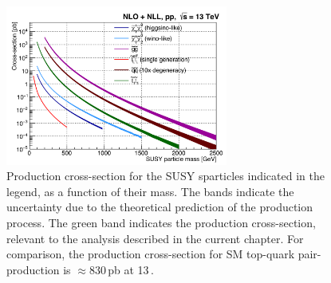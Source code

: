 \begin{figure}[!htb]
    \begin{center}
        \includegraphics[width=0.65\textwidth]{figures/search_stop2l/SUSY_xsec_13TeV_v1}
        \caption{
            Production cross-section for the SUSY sparticles indicated in the legend,
            as a function of their mass.
            The bands indicate the uncertainty due to the theoretical prediction of the production
            process.
            The green band indicates the \stopone production cross-section, relevant to the analysis
            described in the current chapter.
            For comparison, the production cross-section for SM top-quark pair-production is $\approx 830$\,pb at 13\,\TeV.
        }
        \label{fig:susy_xsec}
    \end{center}
\end{figure}

\FloatBarrier
%
%





